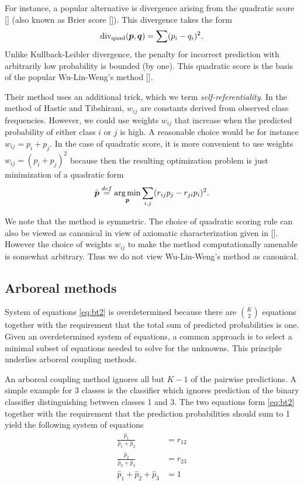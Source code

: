 For instance, a popular alternative is divergence arising from the quadratic  score [\cite{gneiting2007strictly}] (also known as Brier score [\cite{brier1950verification}]). This divergence takes the form
$$
\operatorname*{div}\nolimits_\textrm{quad} (\boldsymbol{p}, \boldsymbol{q})= \sum (p_i - q_i)^2.
$$
Unlike Kullback-Leibler divergence, the penalty for incorrect prediction with arbitrarily low probability is bounded (by one). This quadratic score is the basis of the popular Wu-Lin-Weng's method [\cite{wu2004probability}]. 

Their method uses an additional trick, which we term \emph{self-referentiality}. In the method of Hastie and Tibshirani, $w_{ij}$ are constants derived from observed class frequencies. However, we could use weights $w_{ij}$ that increase when the predicted probability of either class $i$ or $j$ is high. A reasonable choice would be for instance $w_{ij}= p_i + p_j$. In the case of quadratic score, it is more convenient to use weights $w_{ij} = (p_i + p_j)^2$ because then the resulting optimization problem is just minimization of a quadratic form
\begin{align*}
\hat{\boldsymbol{p}} \stackrel{def}{=} \operatorname*{arg\,min}_{\boldsymbol{p}} \sum_{i,j} (r_{ij}p_j - r_{ji}p_i)^2.
\end{align*}

We note that the method is symmetric. The choice of quadratic scoring rule can also be viewed as canonical in view of axiomatic characterization given in  [\cite{selten1998axiomatic}].  However the choice of weights $w_{ij}$ to make the method computationally amenable is somewhat arbitrary. Thus we do not view Wu-Lin-Weng's method as canonical.

\subsection{Arboreal methods}

System of equations \eqref{eq:bt2} is overdetermined because there are $\binom{K}{2}$ equations together with the requirement that the total sum of predicted probabilities is one.  Given an overdetermined system of equations, a common approach is to select a minimal subset of equations needed to solve for the unknowns. This principle underlies arboreal coupling methods.

An arboreal coupling method ignores all but $K-1$ of the pairwise predictions. A simple example for 3 classes is the classifier which ignores prediction of the binary classifier distinguishing between classes 1 and 3. The two equations form \eqref{eq:bt2} together with the requirement that the prediction probabilities should sum to 1 yield the following system of equations
\begin{equation}
	\begin{split}
		\frac{\hat p_1}{\hat p_1 + \hat p_2} &= {r}_{12}\\
		\frac{\hat p_2}{\hat p_2 + \hat p_3} &= {r}_{23}\\
		\hat p_1 + \hat p_2 + \hat p_3 &= 1
	\end{split}
	\label{eq:arb1}
\end{equation}


